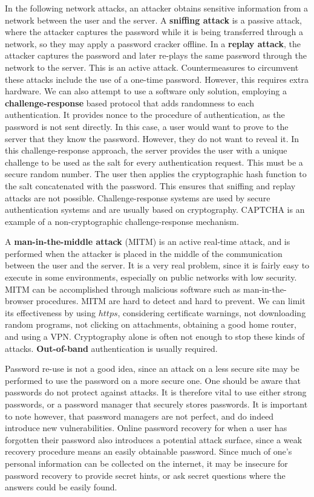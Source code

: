 \documentclass[11pt]{article}
\theoremstyle{plain} %
\theoremstyle{definition}
\theoremstyle{example}
\theoremstyle{remark}
\begin{document}
In the following network attacks, an attacker obtains sensitive information from a network between the user and the server. A \textbf{sniffing attack} is a passive attack, where the attacker captures the password while it is being transferred through a network, so they may apply a password cracker offline. In a \textbf{replay attack}, the attacker captures the password and later re-plays the same password through the network to the server. This is an active attack. Countermeasures to circumvent these attacks include the use of a one-time password. However, this requires extra hardware. We can also attempt to use a software only solution, employing a \textbf{challenge-response} based protocol that adds randomness to each authentication. It provides nonce to the procedure of authentication, as the password is not sent directly. In this case, a user would want to prove to the server that they know the password. However, they do not want to reveal it. In this challenge-response approach, the server provides the user with a unique challenge to be used as the salt for every authentication request. This must be a secure random number. The user then applies the cryptographic hash function to the salt concatenated with the password. This ensures that sniffing and replay attacks are not possible. Challenge-response systems are used by secure authentication systems and are usually based on cryptography. CAPTCHA is an example of a non-cryptographic challenge-response mechanism.

A \textbf{man-in-the-middle attack} (MITM) is an active real-time attack, and is performed when the attacker is placed in the middle of the communication between the user and the server. It is a very real problem, since it is fairly easy to execute in some environments, especially on public networks with low security. MITM can be accomplished through malicious software such as man-in-the-browser procedures. MITM are hard to detect and hard to prevent. We can limit its effectiveness by using $https$, considering certificate warnings, not downloading random programs, not clicking on attachments, obtaining a good home router, and using a VPN. Cryptography alone is often not enough to stop these kinds of attacks. \textbf{Out-of-band} authentication is usually required. 

Password re-use is not a good idea, since an attack on a less secure site may be performed to use the password on a more secure one. One should be aware that passwords do not protect against attacks. It is therefore vital to use either strong passwords, or a password manager that securely stores passwords. It is important to note however, that password managers are not perfect, and do indeed introduce new vulnerabilities. Online password recovery for when a user has forgotten their password also introduces a potential attack surface, since a weak recovery procedure means an easily obtainable password. Since much of one's personal information can be collected on the internet, it may be insecure for password recovery to provide secret hints, or ask secret questions where the answers could be easily found. 
\end{document}
